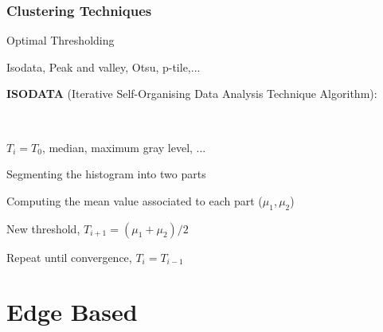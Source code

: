 \documentclass{beamer}
\begin{document}
\begin{frame}
\frametitle{Clustering Techniques}
\begin{block}{Optimal Thresholding}
\begin{itemize}
\footnotesize{
\item Isodata, Peak and valley, Otsu, p-tile,...
\item \textbf{ISODATA} (Iterative Self-Organising Data Analysis Technique Algorithm):} \\
\begin{itemize}
\scriptsize{
\item $T_{i} = T_{0}$, median, maximum gray level, ...
\item Segmenting the histogram into two parts
\item Computing the mean value associated to each part ($\mu_{1}, \mu_{2}$)
\item New threshold, $T_{i+1} = (\mu_{1}+ \mu_{2})/2$
\item Repeat until convergence, $T_{i} = T_{i-1}$

}
\end{itemize}

\end{itemize}

\end{block}
\end{frame}
\section{Edge Based}

\end{document}
